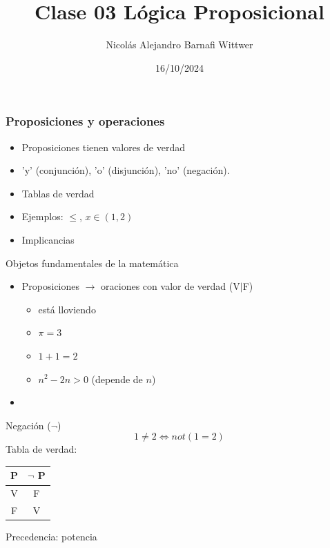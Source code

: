 \documentclass[14pt,aspectratio=169,xcolor=dvipsnames]{beamer}
\title[short title]{Clase 03 Lógica Proposicional}
\subtitle{}
\author[NA Barnafi] {Nicolás Alejandro Barnafi Wittwer}
\institute[UC|CMM] 
{
    Pontificia Universidad Católica de Chile \\
    Centro de Modelamiento Matemático
}
\date{16/10/2024}
\begin{document}
\begin{frame}
    \maketitle
\end{frame}
\begin{frame}\frametitle{Proposiciones y operaciones}
    \begin{itemize}
        \item Proposiciones tienen valores de verdad
        \item 'y' (conjunción), 'o' (disjunción), 'no' (negación). 
        \item  Tablas de verdad
        \item Ejemplos: $\leq$, $x \in (1,2)$
        \item Implicancias
    \end{itemize}
\end{frame}
\begin{frame}{Objetos fundamentales de la matemática}
    \begin{itemize}
        \item Proposiciones $\to$ oraciones con valor de verdad (V$|$F)
            \begin{itemize}
                \item está lloviendo
                \item $\pi=3$
                \item $1+1=2$
                \item $n^2 -2n >0$ (depende de $n$)
            \end{itemize}
        \item 
    \end{itemize}
\end{frame}
\begin{frame}{Negación ($\neg$)}
    $$ 1\neq 2 \Leftrightarrow  not( 1 = 2 )$$
    Tabla de verdad:
        \begin{center}
            \begin{tabular}{c | c}
                \toprule P & $\neg $ P  \\\midrule
                V & F \\
                F & V \\ \bottomrule
            \end{tabular}
        \end{center}
    Precedencia: potencia
\end{frame}
\end{document}
